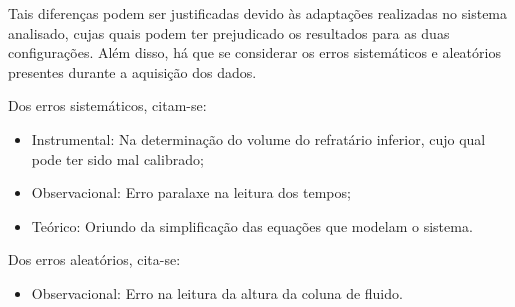 Tais diferenças podem ser justificadas devido às adaptações realizadas no
sistema analisado, cujas quais podem ter prejudicado os resultados para as duas
configurações. Além disso, há que se considerar os erros sistemáticos e
aleatórios presentes durante a aquisição dos dados.

Dos erros sistemáticos, citam-se:
\begin{itemize}
\item Instrumental: Na determinação do volume do refratário inferior, cujo qual
  pode ter sido mal calibrado;
\item Observacional: Erro paralaxe na leitura dos tempos;
\item Teórico: Oriundo da simplificação das equações que modelam o sistema.
\end{itemize}

Dos erros aleatórios, cita-se:
\begin{itemize}
\item Observacional: Erro na leitura da altura da coluna de fluido.
\end{itemize}

